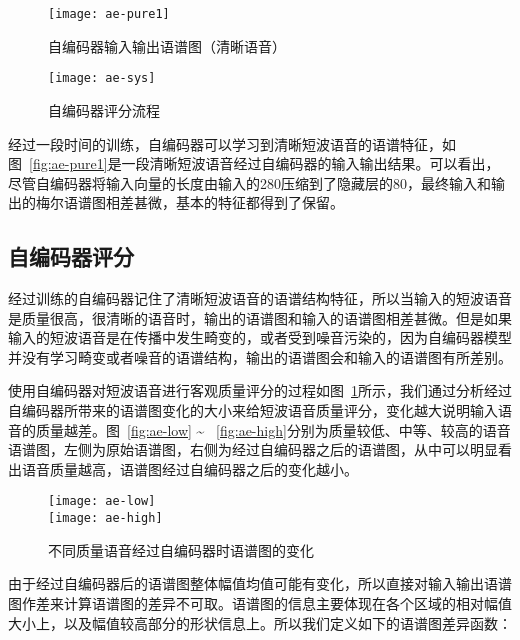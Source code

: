 \begin{figure}
\begin{minipage}{0.55\textwidth}
  \centering
  \texttt{[image: ae-pure1]}
  \caption{自编码器输入输出语谱图（清晰语音）\label{fig:ae-pure1}}
\end{minipage}\hfill
\begin{minipage}{0.35\textwidth}
  \centering
  \texttt{[image: ae-sys]}
  \caption{自编码器评分流程 \label{fig:ae-sys}}
\end{minipage}
\end{figure}

经过一段时间的训练，自编码器可以学习到清晰短波语音的语谱特征，如图~\ref{fig:ae-pure1}是一段清晰短波语音经过自编码器的输入输出结果。可以看出，尽管自编码器将输入向量的长度由输入的280压缩到了隐藏层的80，最终输入和输出的梅尔语谱图相差甚微，基本的特征都得到了保留。

\subsection{自编码器评分}

经过训练的自编码器记住了清晰短波语音的语谱结构特征，所以当输入的短波语音是质量很高，很清晰的语音时，输出的语谱图和输入的语谱图相差甚微。但是如果输入的短波语音是在传播中发生畸变的，或者受到噪音污染的，因为自编码器模型并没有学习畸变或者噪音的语谱结构，输出的语谱图会和输入的语谱图有所差别。

使用自编码器对短波语音进行客观质量评分的过程如图~\ref{fig:ae-sys}所示，我们通过分析经过自编码器所带来的语谱图变化的大小来给短波语音质量评分，变化越大说明输入语音的质量越差。图~\ref{fig:ae-low} \~ ~\ref{fig:ae-high}分别为质量较低、中等、较高的语音语谱图，左侧为原始语谱图，右侧为经过自编码器之后的语谱图，从中可以明显看出语音质量越高，语谱图经过自编码器之后的变化越小。

\begin{figure}
\centering
{} {
    \texttt{[image: ae-low]}
}
\vspace{0.8ex}
\\
 {
    \texttt{[image: ae-high]}
}
\caption{不同质量语音经过自编码器时语谱图的变化\label{fig:ae-diffs}}
\end{figure}

由于经过自编码器后的语谱图整体幅值均值可能有变化，所以直接对输入输出语谱图作差来计算语谱图的差异不可取。语谱图的信息主要体现在各个区域的相对幅值大小上，以及幅值较高部分的形状信息上。所以我们定义如下的语谱图差异函数：

